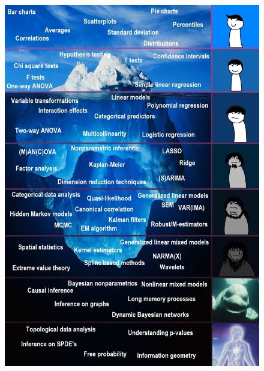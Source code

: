 \begin{frame}
\begin{columns}
\begin{column}{0.45\textwidth}
\begin{figure}
	\includegraphics[width=1.0\textwidth]{img/ml.jpg}
\end{figure}
\end{column}
\end{columns}

\end{frame}